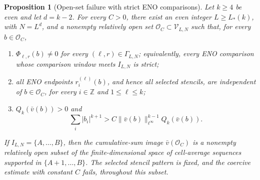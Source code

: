 \documentclass[11pt]{amsart}
\theoremstyle{plain}
\newtheorem{proposition}[theorem]{Proposition}
\theoremstyle{definition}
\theoremstyle{remark}
\numberwithin{equation}{section}
\theoremstyle{plain}
\begin{document}
\begin{proposition}[Open-set failure with strict ENO comparisons]
	\label{prop:even-open-set-failure}
	Let $k\ge4$ be even and let $d=k-2$.  For every $C>0$, there exist an even
	integer $L\ge L_*(k)$, with $N=L^d$, and a nonempty relatively open set
	$\mathcal O_C\subset\mathcal V_{L,N}$ such that, for every
	$b\in\mathcal O_C$,
	\begin{enumerate}[label=\textup{(\roman*)}]
		\item $\Phi_{\ell,r}(b)\ne0$ for every
		$(\ell,r)\in\Gamma_{L,N}$; equivalently, every ENO comparison whose
		comparison window meets $I_{L,N}$ is strict;
		\item all ENO endpoints $r_i^{(\ell)}(b)$, and hence all selected
		stencils, are independent of $b\in\mathcal O_C$, for every
		$i\in\mathbb Z$ and $1\le\ell\le k$;
		\item $Q_k(\bar v(b))>0$ and
		\begin{equation}\label{eq:open-set-coercivity-failure}
			\sum_i|b_i|^{k+1}
			>C\|\bar v(b)\|_{\ell^\infty}^{k-1}Q_k(\bar v(b)).
		\end{equation}
	\end{enumerate}
	If $I_{L,N}=\{A,\ldots,B\}$, then the cumulative-sum image
	$\bar v(\mathcal O_C)$ is a nonempty relatively open subset of the
	finite-dimensional space of cell-average sequences supported in
	$\{A+1,\ldots,B\}$.  The selected stencil pattern is fixed, and the
	coercive estimate with constant $C$ fails, throughout this subset.
\end{proposition}
\end{document}

